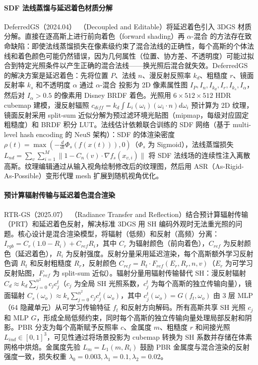 \paragraph{SDF 法线蒸馏与延迟着色材质分解}

DeferredGS（2024.04）~\cite{2404_09412}（Decoupled and Editable）将延迟着色引入 3DGS 材质分解。直接在逐高斯上进行前向着色（forward shading）再 $\alpha$-混合 的方法存在致命缺陷：即使法线蒸馏损失在像素级约束了混合法线的正确性，每个高斯的个体法线和着色颜色可能仍然错误，因为几何属性（位置、协方差、不透明度）可能过拟合到特定光照条件以产生正确的混合法线——换光照后混合就失效。DeferredGS 的解决方案是延迟着色：先将位置 $P$、法线 $n$、漫反射反照率 $k_d$、粗糙度 $r$、镜面反射率 $k_s$ 和不透明度 $\alpha$ 通过 $\alpha$-混合 投影为 2D 像素属性图 $I_P, I_n, I_{k_d}, I_r, I_{k_s}, I_\alpha$，然后对 $I_\alpha > 0.5$ 的像素用 Disney BRDF 着色。光照用 $6\times512\times512$ HDR cubemap 建模，漫反射辐照 $c_{diff} = k_d \int L_i(\omega_i)(\omega_i \cdot n) d\omega_i$ 预计算为 2D 纹理，镜面反射采用 split-sum 近似分解为预过滤环境光贴图（mipmap，每级对应固定粗糙度）和 BRDF 积分 LUT。法线估计依赖联合训练的 SDF 网络（基于 multi-level hash encoding 的 NeuS 架构）：SDF 的体渲染密度 $\rho(t) = \max(-\frac{d}{dt}\Phi_s(f(x(t))), 0)$（$\Phi_s$ 为 Sigmoid），法线蒸馏损失 $L_{nd} = \sum_v \sum_{i=1}^M \|1 - C_n(v) \cdot \nabla f_s(x_{v,i})\|$ 将 SDF 法线场的连续性注入离散高斯。纹理编辑通过从输入视角绘制修改后的纹理图，然后用 ASR（As-Rigid-As-Possible）变形代理 mesh 扩展到随机视角优化。

\paragraph{预计算辐射传输与延迟着色混合渲染}

RTR-GS（2025.07）~\cite{2507_07733}（Radiance Transfer and Reflection）结合预计算辐射传输（PRT）和延迟着色反射，解决标准 3DGS 用 SH 编码外观时无法重光照的问题。核心设计是混合渲染模型，将辐射（低频）和反射（高频）分离：$I_{rgb} = C_r (1.0 - R_i) + C_{ref} R_i$，其中 $C_r$ 为辐射颜色（前向着色），$C_{ref}$ 为反射颜色（延迟着色），$R_i$ 为反射强度。反射分量采用延迟渲染，每个高斯额外学习反射色调 $R_t$ 和反射粗糙度 $R_r$，反射颜色 $C_{ref} = R_t \cdot F_{ref}(E_r, R_r, n, v)$（$E_r$ 为可学习反射贴图，$F_{ref}$ 为 split-sum 近似）。辐射分量用辐射传输替代 SH：漫反射辐射 $C_d \approx k_d \sum_{j=0}^{n^2} c_j c_j^t$（$c_j$ 为全局 SH 光照系数，$c_j^t$ 为每个高斯的独立传输向量），镜面辐射 $C_s(\omega_o) \approx k_s \sum_{j=0}^{n^2} c_j c_j^t(\omega_o)$，其中 $c_j^t(\omega_o) = G(f_t, \omega_o)$ 由 3 层 MLP（64 隐藏单元）从可学习传输特征 $f_t$ 和反射方向解码。所有高斯共享 SH 光照 $c_j$ 和 MLP $G$，形成全局低频约束，同时每个高斯的独立传输向量处理局部反射和阴影。PBR 分支为每个高斯赋予反照率 $c$、金属度 $m$、粗糙度 $r$ 和间接光照 $L_{ind} \in [0,1]^3$，可见性通过将场景投影为 cubemap 转换为 SH 系数并存储在体素网格中烘焙。金属度先验 $L_m = L_1(m, R_i)$ 鼓励 PBR 金属度与混合渲染的反射强度一致，损失权重 $\lambda_0=0.003, \lambda_1=0.1, \lambda_2=0.02$。

